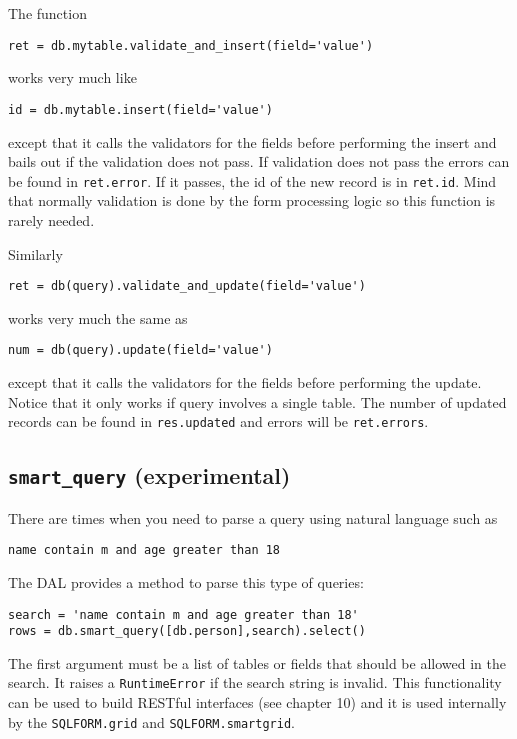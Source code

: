 \documentclass[justified,sixbynine,notoc]{tufte-book}
\def\ft{\small\tt}
\begin{document}
\begin{fullwidth}
The function

\begin{lstlisting}
ret = db.mytable.validate_and_insert(field='value')
\end{lstlisting}
\noindent works very much like

\begin{lstlisting}
id = db.mytable.insert(field='value')
\end{lstlisting}
\noindent except that it calls the validators for the fields before performing the insert and bails out if the validation does not pass. If validation does not pass the errors can be found in {\ft ret.error}. If it passes, the id of the new record is in {\ft ret.id}. Mind that normally validation is done by the form processing logic so this function is rarely needed.

Similarly

\begin{lstlisting}
ret = db(query).validate_and_update(field='value')
\end{lstlisting}
\noindent works very much the same as

\begin{lstlisting}
num = db(query).update(field='value')
\end{lstlisting}
\noindent except that it calls the validators for        the fields before performing the update. Notice that it only works if query involves a single table. The number of updated records can be found in {\ft res.updated} and errors will be {\ft ret.errors}.

\goodbreak\subsection{{\ft smart\_query} (experimental)}

There are times when you need to parse a query using natural language such as

\begin{lstlisting}
name contain m and age greater than 18
\end{lstlisting}

The DAL provides a method to parse this type of queries:

\begin{lstlisting}
search = 'name contain m and age greater than 18'
rows = db.smart_query([db.person],search).select()
\end{lstlisting}

The first argument must be a list of tables or fields that should be allowed in the search. It raises a {\ft RuntimeError} if the search string is invalid. This functionality can be used to build RESTful interfaces (see chapter 10) and it is used internally by the {\ft SQLFORM.grid} and {\ft SQLFORM.smartgrid}.


\end{fullwidth}
\end{document}

